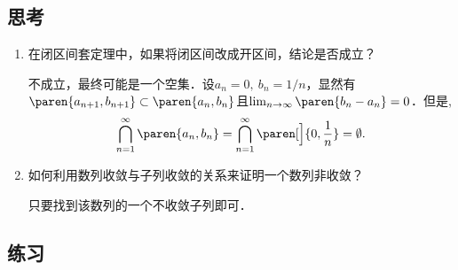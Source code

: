 \subsection*{思考}

\begin{enumerate}
\item 在闭区间套定理中，如果将闭区间改成开区间，结论是否成立？

  \ifshowsolp
  不成立，最终可能是一个空集．设\(a_n = 0,\ b_n = 1/n\)，显然有\(\paren{a_{n+1}, b_{n+1}} \subset \paren{a_n, b_n}\)且\(\lim_{n\to\infty} \paren{b_n - a_n} = 0\)．但是,
  \begin{equation*}
    \bigcap_{n=1}^\infty \paren{a_n, b_n} = \bigcap_{n=1}^\infty \paren[\Big]{0, \frac1n} = \emptyset.
  \end{equation*}
  \fi

\item 如何利用数列收敛与子列收敛的关系来证明一个数列非收敛？

  \ifshowsolp
  只要找到该数列的一个不收敛子列即可．
  \fi
\end{enumerate}

\ifshowex
{}
\subsection*{练习}

